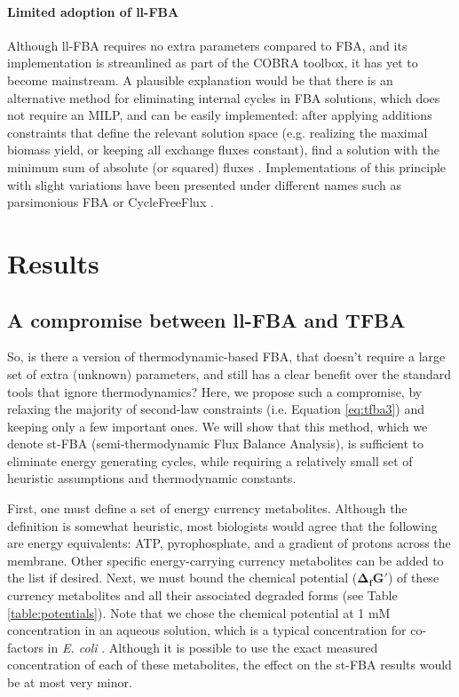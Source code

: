 \documentclass[twocolumn]{bmcart}%
\begin{document}
\paragraph{Limited adoption of ll-FBA} Although ll-FBA requires no extra parameters compared to FBA, and its implementation is streamlined as part of the COBRA toolbox, it has yet to become mainstream. A plausible explanation would be that there is an alternative method for eliminating internal cycles in FBA solutions, which does not require an MILP, and can be easily implemented: after applying additions constraints that  define the relevant solution space (e.g. realizing the maximal biomass yield, or keeping all exchange fluxes constant), find a solution with the minimum sum of absolute (or squared) fluxes \cite{Holzhutter2004-qj}. Implementations of this principle with slight variations have been presented under different names such as parsimonious FBA \cite{Lewis2010-rx, Schuetz2012-sv} or CycleFreeFlux \cite{Desouki2015-lh}.

\section*{Results}

\subsection*{A compromise between ll-FBA and TFBA}
So, is there a version of thermodynamic-based FBA, that doesn't require a large set of extra (unknown) parameters, and still has a clear benefit over the standard tools that ignore thermodynamics? Here, we propose such a compromise, by relaxing the majority of second-law constraints (i.e. Equation \ref{eq:tfba3}) and keeping only a few important ones. We will show that this method, which we denote st-FBA (semi-thermodynamic Flux Balance Analysis), is sufficient to eliminate energy generating cycles, while requiring a relatively small set of heuristic assumptions and thermodynamic constants.

First, one must define a set of energy currency metabolites. Although the definition is somewhat heuristic, most biologists would agree that the following are energy equivalents: ATP, pyrophosphate, and a gradient of protons across the membrane. Other specific energy-carrying currency metabolites can be added to the list if desired. Next, we must bound the chemical potential ($\mathbf{\Delta_f G'}$) of these currency metabolites and all their associated degraded forms (see Table \ref{table:potentials}). Note that we chose the chemical potential at 1 mM concentration in an aqueous solution, which is a typical concentration for co-factors in \emph{E. coli} \cite{Bennett2009-rm}. Although it is possible to use the exact measured concentration of each of these metabolites, the effect on the st-FBA results would be at most very minor. 
\end{document}

